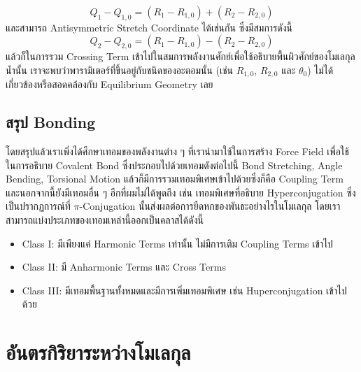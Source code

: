 %
\begin{equation}
  Q_1-Q_{1,0}
  =
  \left(R_1-R_{1,0}\right)+\left(R_2-R_{2,0}\right)
\end{equation}
%
และสามารถ Antisymmetric Stretch Coordinate ได้เช่นกัน ซึ่งมีสมการดังนี้
%
\begin{equation}
  Q_2-Q_{2,0}
  =
  \left(R_1-R_{1,0}\right)-\left(R_2-R_{2,0}\right)
\end{equation}
%
แล้วก็ในการรวม Crossing Term เข้าไปในสมการพลังงานศักย์เพื่อใช้อธิบายพื้นผิวศักย์ของโมเลกุลน้ำนั้น เราจะพบว่าพารามิเตอร์ที่ขึ้นอยู่กับชนิดของอะตอมนั้น (เช่น $R_{1,0}$, $R_{2,0}$ และ $\theta_{0}$) ไม่ได้เกี่ยวข้องหรือสอดคล้องกับ Equilibrium Geometry เลย

\subsection{สรุป Bonding}

โดยสรุปแล้วเราเพิ่งได้ศึกษาเทอมของพลังงานต่าง ๆ ที่เรานำมาใช้ในการสร้าง Force Field เพื่อใช้ในการอธิบาย Covalent Bond ซึ่งประกอบไปด้วยเทอมดังต่อไปนี้ Bond Stretching, Angle Bending, Torsional Motion แล้วก็มีการรวมเทอมพิเศษเข้าไปด้วยซึ่งก็คือ Coupling Term และนอกจากนี้ยังมีเทอมอื่น ๆ อีกที่ผมไม่ได้พูดถึง เช่น เทอมพิเศษที่อธิบาย Hyperconjugation ซึ่งเป็นปรากฏการณ์ที่ $\pi$-Conjugation นั้นส่งผลต่อการยืดหกของพันธะอย่างไรในโมเลกุล โดยเราสามารถแบ่งประเภทของเทอมเหล่านี้ออกเป็นคลาสได้ดังนี้
%
\begin{itemize}[topsep=0pt,noitemsep]
  \setlength\itemsep{0.5em}
  \item Class I: มีเพียงแค่ Harmonic Terms เท่านั้น ไม่มีการเติม Coupling Terms เข้าไป

  \item Class II: มี Anharmonic Terms และ Cross Terms

  \item Class III: มีเทอมพื้นฐานทั้งหมดและมีการเพิ่มเทอมพิเศษ เช่น Huperconjugation เข้าไปด้วย
\end{itemize}

\section{อันตรกิริยาระหว่างโมเลกุล}

